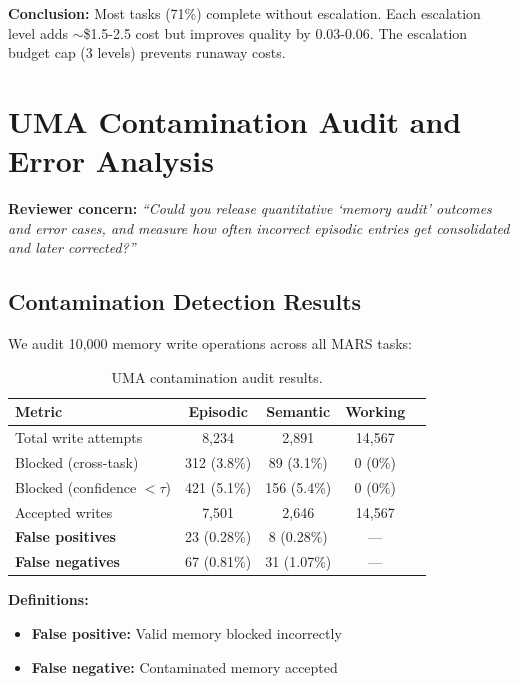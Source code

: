 \documentclass{article}
\theoremstyle{plain}
\theoremstyle{definition}
\theoremstyle{remark}
\begin{document}
\textbf{Conclusion:} Most tasks (71\%) complete without escalation. Each escalation level adds $\sim$\$1.5-2.5 cost but improves quality by 0.03-0.06. The escalation budget cap (3 levels) prevents runaway costs.

\section{UMA Contamination Audit and Error Analysis}
\label{app:uma-audit}

\textbf{Reviewer concern:} \textit{``Could you release quantitative `memory audit' outcomes and error cases, and measure how often incorrect episodic entries get consolidated and later corrected?''}

\subsection{Contamination Detection Results}

We audit 10,000 memory write operations across all MARS tasks:

\begin{table}[h]
\centering
\caption{UMA contamination audit results.}
\label{tab:uma-audit}
\small
\begin{tabular}{lcccc}
\toprule
\textbf{Metric} & \textbf{Episodic} & \textbf{Semantic} & \textbf{Working} \\
\midrule
Total write attempts & 8,234 & 2,891 & 14,567 \\
Blocked (cross-task) & 312 (3.8\%) & 89 (3.1\%) & 0 (0\%) \\
Blocked (confidence $<\tau$) & 421 (5.1\%) & 156 (5.4\%) & 0 (0\%) \\
Accepted writes & 7,501 & 2,646 & 14,567 \\
\midrule
\textbf{False positives} & 23 (0.28\%) & 8 (0.28\%) & --- \\
\textbf{False negatives} & 67 (0.81\%) & 31 (1.07\%) & --- \\
\bottomrule
\end{tabular}
\end{table}

\textbf{Definitions:}
\begin{itemize}[nosep,leftmargin=*]
\item \textbf{False positive:} Valid memory blocked incorrectly
\item \textbf{False negative:} Contaminated memory accepted
\end{itemize}
\end{document}
